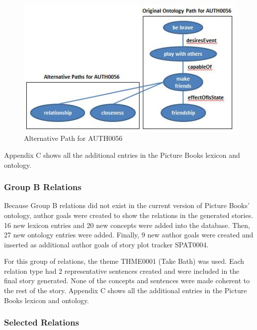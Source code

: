 \begin{figure}[h]                %
   \centering                    %
   \includegraphics{altpatheffectofisstate.jpg}      %
   \caption{Alternative Path for AUTH0056}
    \label{fig:altpatheffectofisstate}
\end{figure}

Appendix C shows all the additional entries in the Picture Books lexicon and ontology.

\subsubsection*{Group B Relations}

Because Group B relations did not exist in the current version of Picture Books' ontology, author goals were created to show the relations in the generated stories. 16 new lexicon entries and 20 new concepts were added into the database. Then, 27 new ontology entries were added. Finally, 9 new author goals were created and inserted as additional author goals of story plot tracker SPAT0004. 

For this group of relations, the theme THME0001 (Take Bath) was used. Each relation type had 2 representative sentences created and were included in the final story generated. None of the concepts and sentences were made coherent to the rest of the story. Appendix C shows all the additional entries in the Picture Books lexicon and ontology.

\subsubsection{Selected Relations}
\label{sec:selectedrelations}

